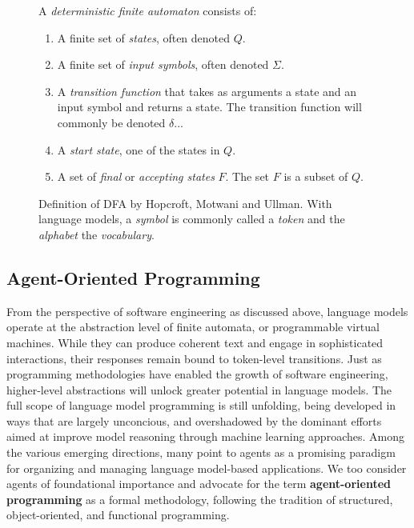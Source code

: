\begin{figure}[h]
    \centering
    \begin{tcolorbox}[width=1.0\linewidth, colframe=black, colback=white, sharp corners]
        A \emph{deterministic finite automaton} consists of:
        \begin{enumerate}
            \item A finite set of \emph{states}, often denoted $Q$.
            \item A finite set of \emph{input symbols}, often denoted $\Sigma$.
            \item A \emph{transition function} that takes as arguments a state and an input symbol and returns a state. The transition function will commonly be denoted $\delta$...
            \item A \emph{start state}, one of the states in $Q$.
            \item A set of \emph{final} or \emph{accepting states} $F$. The set $F$ is a subset of $Q$.
        \end{enumerate}
    \end{tcolorbox}
    \caption{Definition of DFA by Hopcroft, Motwani and Ullman\cite{hopcroft2006}.  With language models, a \emph{symbol} is commonly called a \emph{token} and the \emph{alphabet} the \emph{vocabulary}.}
    \label{fig:quote}
\end{figure}

\subsection{Agent-Oriented Programming}

From the perspective of software engineering as discussed above, language models operate at the abstraction level of finite automata, or programmable virtual machines. While they can produce coherent text and engage in sophisticated interactions, their responses remain bound to token-level transitions. Just as programming methodologies have enabled the growth of software engineering, higher-level abstractions will unlock greater potential in language models. The full scope of language model programming is still unfolding, being developed in ways that are largely unconcious, and overshadowed by the dominant efforts aimed at improve model reasoning through machine learning approaches\cite{openai24b,deepseek25}. Among the various emerging directions, many point to agents as a promising paradigm for organizing and managing language model-based applications\cite{masterman24,wang24,google24}. We too consider agents of foundational importance and advocate for the term \textbf{agent-oriented programming} as a formal methodology, following the tradition of structured, object-oriented, and functional programming.

